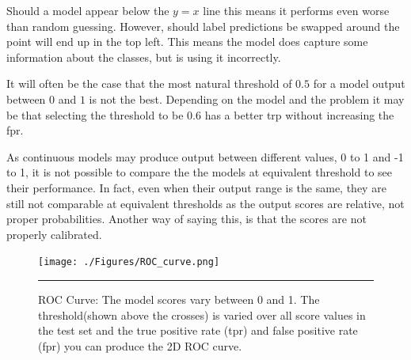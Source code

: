 Should a model appear below the $y=x$ line this means it performs even worse than random guessing.
However, should label predictions be swapped around the point will end up in the top left.
This means the model does capture some information about the classes, but is using it incorrectly.


It will often be the case that the most natural threshold of $0.5$ for a model output between $0$ and $1$ is not the best.
Depending on the model and the problem it may be that selecting the threshold to be 0.6 has a better trp without increasing the fpr.

As continuous models may produce output between different values, 0 to 1 and -1 to 1, it is not possible to compare the the models at equivalent threshold to see their performance.
In fact, even when their output range is the same, they are still not comparable at equivalent thresholds as the output scores are relative, not proper probabilities.
Another way of saying this, is that the scores are not properly calibrated.

\begin{figure}[htbp]
	\centering
		\texttt{[image: ./Figures/ROC\_curve.png]}
		\rule{35em}{0.5pt}
	\caption[ROC Curve]{ROC Curve: The model scores vary between 0 and 1. The threshold(shown above the crosses) is varied over all score values in the test set and the true positive rate (tpr) and false positive rate (fpr) you can produce the 2D ROC curve.}
	\label{fig:roc_curve}
\end{figure}



